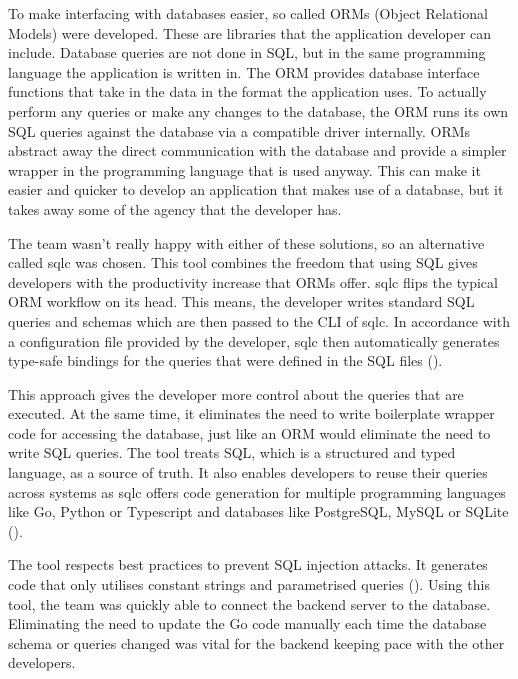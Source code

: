 To make interfacing with databases easier, so called ORMs (Object Relational
Models) were developed. These are libraries that the application developer can
include. Database queries are not done in SQL, but in the same programming
language the application is written in. The ORM provides database interface
functions that take in the data in the format the application uses. To actually
perform any queries or make any changes to the database, the ORM runs its own
SQL queries against the database via a compatible driver internally. ORMs
abstract away the direct communication with the database and provide a simpler
wrapper in the programming language that is used anyway. This can make it easier
and quicker to develop an application that makes use of a database, but it takes
away some of the agency that the developer has.


The team wasn't really happy with either of these solutions, so an alternative
called sqlc was chosen. This tool combines the freedom that using SQL gives
developers with the productivity increase that ORMs offer. sqlc flips the
typical ORM workflow on its head. This means, the developer writes standard SQL
queries and schemas which are then passed to the CLI of sqlc. In accordance with
a configuration file provided by the developer, sqlc then automatically
generates type-safe bindings for the queries that were defined in the SQL files
(\cite{sqlc_introduction}).

This approach gives the developer more control about the queries that are
executed. At the same time, it eliminates the need to write boilerplate wrapper
code for accessing the database, just like an ORM would eliminate the need to
write SQL queries. The tool treats SQL, which is a structured and typed
language, as a source of truth. It also enables developers to reuse their
queries across systems as sqlc offers code generation for multiple programming
languages like Go, Python or Typescript and databases like PostgreSQL, MySQL or
SQLite (\cite{sqlc_documentation_language_support}).

The tool respects best practices to prevent SQL injection attacks. It generates
code that only utilises constant strings and parametrised queries
(\cite{sqlc_injection}). Using this tool, the team was quickly able to
connect the backend server to the database. Eliminating the need to update the
Go code manually each time the database schema or queries changed was vital for
the backend keeping pace with the other developers.

